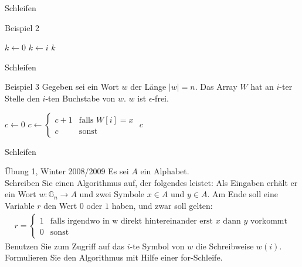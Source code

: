\begin{frame}{Schleifen}
    \begin{exampleblock}{Beispiel 2}
        \begin{algorithm}
            \begin{algorithmic}
                \State $k \gets 0$
                    \State $k\gets i$
                \EndFor
                \Ensure $k$
            \end{algorithmic}
        \end{algorithm}
    \end{exampleblock}
\end{frame}

\begin{frame}{Schleifen}
    \begin{exampleblock}{Beispiel 3}
        Gegeben sei ein Wort $w$ der Länge $\left| w\right| = n$. Das Array $W$ hat an $i$-ter Stelle den $i$-ten Buchstabe von $w$. $w$ ist $\epsilon$-frei.
        \begin{algorithm}
            \begin{algorithmic}
                \State $c \gets 0$
                \State $c\gets \begin{cases} c + 1& \text{falls } W\left[ i\right] = x \\ c
                    &\text{sonst}\end{cases}$
                \EndFor
                \Ensure $c$
            \end{algorithmic}
        \end{algorithm}
    \end{exampleblock}
\end{frame}

\begin{frame}{Schleifen}
    \begin{exampleblock}{Übung 1, Winter 2008/2009}
        Es sei $A$ ein Alphabet.\\
        Schreiben Sie einen Algorithmus auf, der folgendes leistet: Als Eingaben erhält er ein Wort $w: \mathbb{G}_n\rightarrow A$ und zwei Symbole $x \in A$ und $y \in A$. Am Ende soll eine Variable $r$ den Wert $0$ oder $1$ haben, und zwar soll gelten:\\
        \begin{align*}
            r = \begin{cases} 1 & \text{falls irgendwo in w direkt hintereinander erst $x$ dann $y$ vorkommt}\\ 0 &\text{sonst}\end{cases}
        \end{align*}
        Benutzen Sie zum Zugriff auf das $i$-te Symbol von $w$ die Schreibweise $w\left( i\right)$. Formulieren Sie den Algorithmus mit Hilfe einer for-Schleife.
    \end{exampleblock}
\end{frame}

